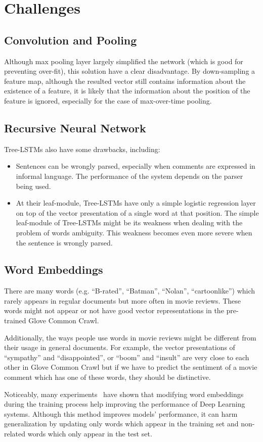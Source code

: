 \section{Challenges}
\subsection{Convolution and Pooling}\label{sec:cnn-weak}
Although max pooling layer largely simplified the network (which is good for preventing over-fit), this solution have a clear disadvantage.
By down-sampling a feature map, although the resulted vector still contains information about the existence of a feature, it is likely that the information about the position of the feature is ignored, especially for the case of max-over-time pooling.
\subsection{Recursive Neural Network}\label{sec:recursive-nn-weak}
Tree-LSTMs also have some drawbacks, including:
\begin{itemize}
	\item Sentences can be wrongly parsed, especially when comments are expressed in informal language.
	The performance of the system depends on the parser being used.
	\item At their leaf-module, Tree-LSTMs have only a simple logistic regression layer on top of the vector presentation of a single word at that position.
	The simple leaf-module of Tree-LSTMs might be its weakness when dealing with the problem of words ambiguity.
	This weakness becomes even more severe when the sentence is wrongly parsed. 
\end{itemize}
\subsection{Word Embeddings}\label{sec:word-weak}
There are many words (e.g. ``B-rated'', ``Batman'', ``Nolan'', ``cartoonlike'') which rarely appears in regular documents but more often in movie reviews.
These words might not appear or not have good vector representations in the pre-trained Glove Common Crawl.

Additionally, the ways people use words in movie reviews might be different from their usage in general documents.
For example, the vector presentations of ``sympathy'' and ``disappointed'', or ``boom'' and ``insult'' are very close to each other in Glove Common Crawl but if we have to predict the sentiment of a movie comment which has one of these words, they should be distinctive.

Noticeably, many experiments~\cite{treeLSTM, KimCNN} have shown that modifying word embeddings during the training process help improving the performance of Deep Learning systems.
Although this method improves models' performance, it can harm generalization by updating only words which appear in the training set and non-related words which only appear in the test set.